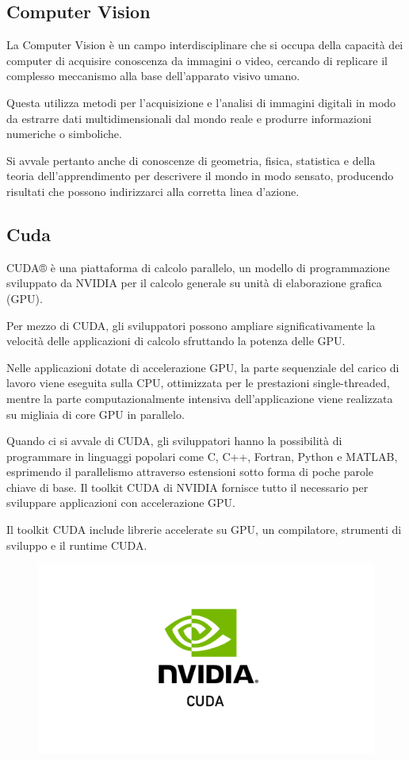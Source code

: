 \subsection{Computer Vision}
La Computer Vision è un campo interdisciplinare che si occupa della capacità dei computer di acquisire conoscenza da immagini o video, cercando di replicare il complesso meccanismo alla base dell'apparato visivo umano. 

Questa utilizza metodi per l'acquisizione e l'analisi di immagini digitali in modo da estrarre dati multidimensionali dal mondo reale e produrre informazioni numeriche o simboliche. 

Si avvale pertanto anche di conoscenze di geometria, fisica, statistica e della teoria dell'apprendimento per descrivere il mondo in modo sensato, producendo risultati che possono indirizzarci alla corretta linea d'azione.

\subsection{Cuda \cite{CUDA}} 
CUDA® è una piattaforma di calcolo parallelo, un modello di programmazione sviluppato da NVIDIA per il calcolo generale su unità di elaborazione grafica (GPU). 

Per mezzo di CUDA, gli sviluppatori possono ampliare significativamente la velocità delle applicazioni di calcolo sfruttando la potenza delle GPU.

Nelle applicazioni dotate di accelerazione GPU, la parte sequenziale del carico di lavoro viene eseguita sulla CPU, ottimizzata per le prestazioni single-threaded, mentre la parte computazionalmente intensiva dell’applicazione viene realizzata su migliaia di core GPU in parallelo. 

Quando ci si avvale di CUDA, gli sviluppatori hanno la possibilità di programmare in linguaggi popolari come C, C++, Fortran, Python e MATLAB, esprimendo il parallelismo attraverso estensioni sotto forma di poche parole chiave di base.
Il toolkit CUDA di NVIDIA fornisce tutto il necessario per sviluppare applicazioni con accelerazione GPU.

Il toolkit CUDA include librerie accelerate su GPU, un compilatore, strumenti di sviluppo e il runtime CUDA.

\begin{figure}
    \begin{center}    
        \includegraphics[width=0.9\linewidth]{images/image1.png}
    \end{center}
\end{figure}

